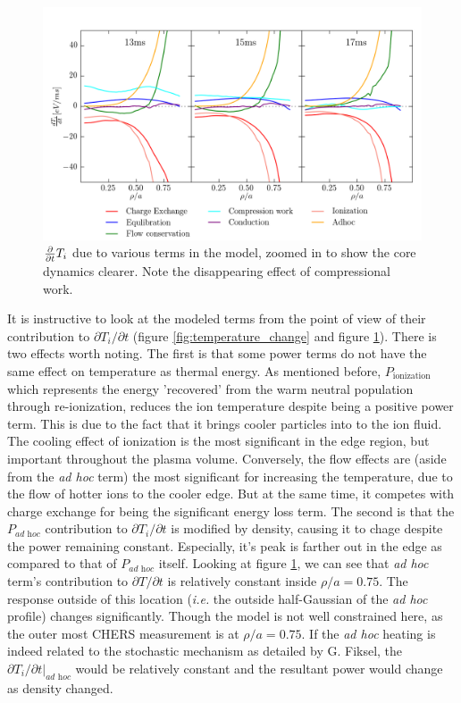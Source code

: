 \begin{figure}
    \centering
    \includegraphics[width = \linewidth]{ion_transport_results/dtempdt_zoomed.png}
    \caption[$\partialt T_i$ core details]{$\partialt T_i$ due to various terms in the model, zoomed in to show the core dynamics clearer. Note the disappearing effect of compressional work. }
    \label{fig:temperature_change_zoomed}
\end{figure}

It is instructive to look at the modeled terms from the point of view of their contribution to $\partial T_i /\partial t$ (figure \ref{fig:temperature_change} and figure \ref{fig:temperature_change_zoomed}). There is two effects worth noting. The first is that some power terms do not have the same effect on temperature as thermal energy. As mentioned before, $P_{\textrm{ionization}}$ which represents the energy 'recovered' from the warm neutral population through re-ionization, reduces the ion temperature despite being a positive power term. This is due to the fact that it brings cooler particles into to the ion fluid. The cooling effect of ionization is the most significant in the edge region, but important throughout the plasma volume. Conversely, the flow effects are (aside from the \textit{ad hoc} term) the most significant for increasing the temperature, due to the flow of hotter ions to the cooler edge. But at the same time, it competes with charge exchange for being the significant energy loss term. The second is that the $P_{\textit{ad hoc}}$ contribution to $\partial T_i / \partial t$ is modified by density, causing it to chage despite the power remaining constant. Especially, it's peak is farther out in the edge as compared to that of $P_{\textit{ad hoc}}$ itself. Looking at figure \ref{fig:temperature_change_zoomed}, we can see that \textit{ad hoc} term's contribution to $\partial T/\partial t$ is relatively constant inside $\rho/a = 0.75$. The response outside of this location (\textit{i.e.} the outside half-Gaussian of the \textit{ad hoc} profile) changes significantly. Though the model is not well constrained here, as the outer most CHERS measurement is at $\rho/a = 0.75$. If the \textit{ad hoc} heating is indeed related to the stochastic mechanism as detailed by G. Fiksel, the $\left.\partial T_{i}/\partial t\right|_{\textit{ad hoc}}$ would be relatively constant and the resultant power would change as density changed. 

